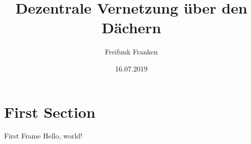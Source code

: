 \documentclass{beamer}
\title{Dezentrale Vernetzung über den Dächern}
\date{16.07.2019}
\author{Freifunk Franken}
\begin{document}
  \maketitle
  \section{First Section}
  \begin{frame}{First Frame}
    Hello, world!
  \end{frame}
\end{document}
